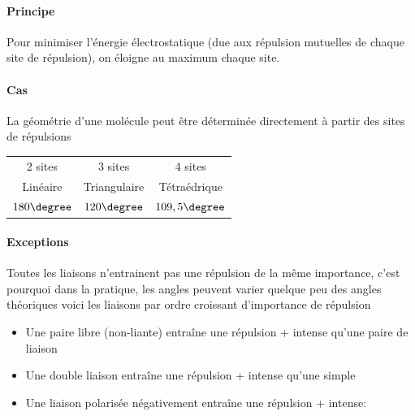 \documentclass[11pt,a4paper,french]{article}
\begin{document}
\paragraph{Principe}
Pour minimiser l'énergie électrostatique (due aux répulsion mutuelles de chaque site de répulsion), on éloigne au maximum chaque site.

\paragraph{Cas}
La géométrie d'une molécule peut être déterminée directement à partir des sites de répulsions
\begin{center}
	\begin{tabular}{ccc}
		2 sites & 3 sites & 4 sites\\
		Linéaire & Triangulaire & Tétraédrique\\
		$180\degree$ & $120\degree$ & $109,5\degree$\\
	\end{tabular}
\end{center}

\paragraph{Exceptions}
Toutes les liaisons n'entrainent pas une répulsion de la même importance, c'est pourquoi dans la pratique, les angles peuvent varier quelque peu des angles théoriques voici les liaisons par ordre croissant d'importance de répulsion
\begin{itemize}
	\item Une paire libre (non-liante) entraîne une répulsion + intense qu'une paire de liaison
	\item Une double liaison entraîne une répulsion + intense qu'une simple
	\item Une liaison polarisée négativement entraîne une répulsion + intense:
		\begin{center}
		\end{center}
\end{itemize}
\end{document}
